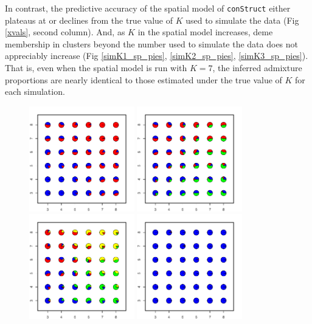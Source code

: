 \documentclass[12pt]{article}
\begin{document}
In contrast, the predictive accuracy of the spatial model of \texttt{conStruct} 
either plateaus at or declines from the true value of $K$ used to simulate the data (Fig \ref{xvals}, second column).
And, as $K$ in the spatial model increases, 
deme membership in clusters beyond the number used to simulate the data does not appreciably increase 
(Fig \ref{simK1_sp_pies}, \ref{simK2_sp_pies}, \ref{simK3_sp_pies}).
That is, even when the spatial model is run with $K=7$, 
the inferred admixture proportions are nearly identical to 
those estimated under the true value of $K$ for each simulation.

\begin{figure}
	\centering
			{\includegraphics[width=1.8in,height=1.8in]{figs/sims/simK1_nsp_pies_K2.pdf}}
			{\includegraphics[width=1.8in,height=1.8in]{figs/sims/simK1_nsp_pies_K3.pdf}}
			{\includegraphics[width=1.8in,height=1.8in]{figs/sims/simK1_nsp_pies_K4.pdf}}
			{\includegraphics[width=1.8in,height=1.8in]{figs/sims/simK1_sp_pies_K5.pdf}}

\end{figure}
\end{document}
